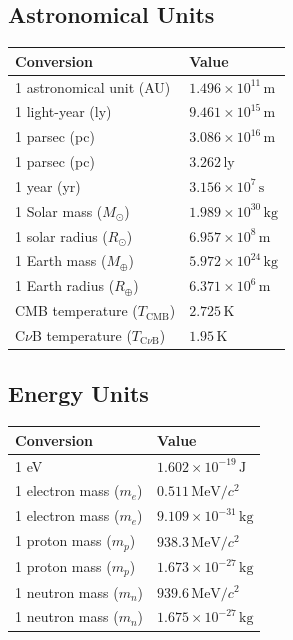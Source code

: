 \subsection*{Astronomical Units}
\begin{center}
\begin{tabular}{ll}
\toprule
\textbf{Conversion} & \textbf{Value} \\
\midrule
1 astronomical unit (AU) & $1.496 \times 10^{11} \,\mathrm{m}$ \\
1 light-year (ly)   & $9.461\times10^{15}\,\mathrm{m}$ \\
1 parsec (pc)       & $3.086\times10^{16}\,\mathrm{m}$ \\
1 parsec (pc)       & $3.262\,\mathrm{ly}$ \\
1 year (yr)         & $3.156\times10^{7}\,\mathrm{s}$ \\
\midrule
1 Solar mass ($M_\odot$) & $1.989 \times 10^{30} \,\mathrm{kg}$ \\
1 solar radius ($R_\odot$) & $6.957 \times 10^8 \,\mathrm{m}$ \\
1 Earth mass ($M_\oplus$) & $5.972 \times 10^{24} \,\mathrm{kg}$ \\
1 Earth radius ($R_\oplus$) & $6.371 \times 10^6 \,\mathrm{m}$ \\
CMB temperature ($T_\text{CMB}$) & $2.725 \,\mathrm{K}$ \\
C$\nu$B temperature ($T_{\text{C}\nu\text{B}}$) & $1.95 \,\mathrm{K}$ \\
\bottomrule
\end{tabular}
\end{center}

\clearpage
\subsection*{Energy Units}
\begin{center}
\begin{tabular}{ll}
\toprule
\textbf{Conversion} & \textbf{Value} \\
\midrule
1 eV                & $1.602 \times 10^{-19} \,\mathrm{J}$ \\
1 electron mass ($m_e$) & $0.511 \,\mathrm{MeV}/c^2$ \\
1 electron mass ($m_e$) & $9.109 \times 10^{-31} \,\mathrm{kg}$ \\
1 proton mass ($m_p$) & $938.3 \,\mathrm{MeV}/c^2$ \\
1 proton mass ($m_p$) & $1.673 \times 10^{-27} \,\mathrm{kg}$ \\
1 neutron mass ($m_n$) & $939.6 \,\mathrm{MeV}/c^2$ \\
1 neutron mass ($m_n$) & $1.675 \times 10^{-27} \,\mathrm{kg}$ \\
\bottomrule
\end{tabular}
\end{center}


